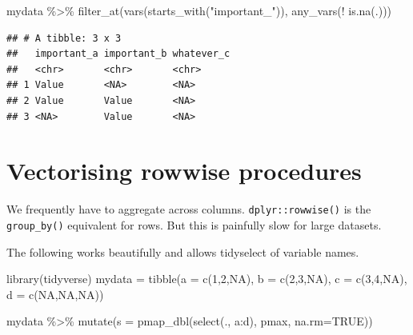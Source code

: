 \documentclass[
]{book}
\newenvironment{Shaded}{\begin{snugshade}}{\end{snugshade}}
\newcommand{\AttributeTok}[1]{\textcolor[rgb]{0.77,0.63,0.00}{#1}}
\newcommand{\ConstantTok}[1]{\textcolor[rgb]{0.00,0.00,0.00}{#1}}
\newcommand{\DecValTok}[1]{\textcolor[rgb]{0.00,0.00,0.81}{#1}}
\newcommand{\FunctionTok}[1]{\textcolor[rgb]{0.00,0.00,0.00}{#1}}
\newcommand{\NormalTok}[1]{#1}
\newcommand{\OtherTok}[1]{\textcolor[rgb]{0.56,0.35,0.01}{#1}}
\newcommand{\SpecialCharTok}[1]{\textcolor[rgb]{0.00,0.00,0.00}{#1}}
\newcommand{\StringTok}[1]{\textcolor[rgb]{0.31,0.60,0.02}{#1}}
\begin{document}
\begin{Shaded}
\begin{Highlighting}[]
\NormalTok{mydata }\SpecialCharTok{\%\textgreater{}\%} 
  \FunctionTok{filter\_at}\NormalTok{(}\FunctionTok{vars}\NormalTok{(}\FunctionTok{starts\_with}\NormalTok{(}\StringTok{"important\_"}\NormalTok{)), }\FunctionTok{any\_vars}\NormalTok{(}\SpecialCharTok{!} \FunctionTok{is.na}\NormalTok{(.)))}
\end{Highlighting}
\end{Shaded}

\begin{verbatim}
## # A tibble: 3 x 3
##   important_a important_b whatever_c
##   <chr>       <chr>       <chr>     
## 1 Value       <NA>        <NA>      
## 2 Value       Value       <NA>      
## 3 <NA>        Value       <NA>
\end{verbatim}

\hypertarget{vectorising-rowwise-procedures}{%
\section{Vectorising rowwise procedures}\label{vectorising-rowwise-procedures}}

We frequently have to aggregate across columns. \texttt{dplyr::rowwise()} is the \texttt{group\_by()} equivalent for rows. But this is painfully slow for large datasets.

The following works beautifully and allows tidyselect of variable names.

\begin{Shaded}
\begin{Highlighting}[]
\FunctionTok{library}\NormalTok{(tidyverse)}
\NormalTok{mydata }\OtherTok{=} \FunctionTok{tibble}\NormalTok{(}\AttributeTok{a =} \FunctionTok{c}\NormalTok{(}\DecValTok{1}\NormalTok{,}\DecValTok{2}\NormalTok{,}\ConstantTok{NA}\NormalTok{),}
       \AttributeTok{b =} \FunctionTok{c}\NormalTok{(}\DecValTok{2}\NormalTok{,}\DecValTok{3}\NormalTok{,}\ConstantTok{NA}\NormalTok{),}
       \AttributeTok{c =} \FunctionTok{c}\NormalTok{(}\DecValTok{3}\NormalTok{,}\DecValTok{4}\NormalTok{,}\ConstantTok{NA}\NormalTok{),}
       \AttributeTok{d =} \FunctionTok{c}\NormalTok{(}\ConstantTok{NA}\NormalTok{,}\ConstantTok{NA}\NormalTok{,}\ConstantTok{NA}\NormalTok{))}

\NormalTok{mydata }\SpecialCharTok{\%\textgreater{}\%} 
  \FunctionTok{mutate}\NormalTok{(}\AttributeTok{s =} \FunctionTok{pmap\_dbl}\NormalTok{(}\FunctionTok{select}\NormalTok{(., a}\SpecialCharTok{:}\NormalTok{d), pmax, }\AttributeTok{na.rm=}\ConstantTok{TRUE}\NormalTok{))}
\end{Highlighting}
\end{Shaded}
\end{document}
